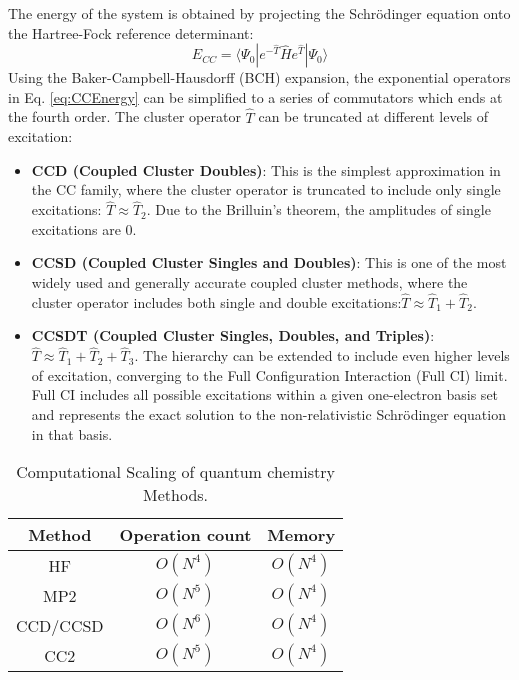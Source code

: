 \iffalse One of the most significant advantages of coupled cluster theory is its property of size consistency. A size-consistent method correctly describes the energy of a system composed of multiple non-interacting subsystems as the sum of the energies of the individual subsystems. The exponential form, when expanded as a Taylor series,
\begin{equation}
    e^{\hat{T}} = 1 + \hat{T} + \frac{1}{2!} \hat{T}^2 + \dots
\end{equation}
inherently includes terms that represent disconnected clusters, which are essential for size consistency. \fi
The energy of the system is obtained by projecting the Schrödinger equation onto the Hartree-Fock reference determinant:
\begin{equation}\label{eq:CCEnergy}
    E_{CC}=\langle \Psi_{0} | e^{-\hat{T}} \hat{H} e^{\hat{T}} | \Psi_{0} \rangle
\end{equation}
Using the Baker-Campbell-Hausdorff (BCH) expansion, the exponential operators in Eq. \ref{eq:CCEnergy} can be simplified to a series of commutators which ends at the fourth order. The cluster operator $\hat{T}$ can be truncated at different levels of excitation:
\begin{itemize}
    \item \textbf{CCD (Coupled Cluster Doubles)}: This is the simplest approximation in the CC family, where the cluster operator is truncated to include only single excitations: $\hat{T} \approx \hat{T}_2$. Due to the Brilluin's theorem, the amplitudes of single excitations are 0. 
    \item \textbf{CCSD (Coupled Cluster Singles and Doubles)}: This is one of the most widely used and generally accurate coupled cluster methods, where the cluster operator includes both single and double excitations:$\hat{T} \approx \hat{T}_1 + \hat{T}_2$.
    \item \textbf{CCSDT (Coupled Cluster Singles, Doubles, and Triples)}: $\hat{T} \approx \hat{T}_1 + \hat{T}_2 + \hat{T}_3$.
    The hierarchy can be extended to include even higher levels of excitation, converging to the Full Configuration Interaction (Full CI) limit. Full CI includes all possible excitations within a given one-electron basis set and represents the exact solution to the non-relativistic Schrödinger equation in that basis.
\end{itemize}

\begin{table}[h!]
    \centering
    \begin{tabular}{ccc}
        Method & Operation count & Memory \\
        \hline
        HF & $O(N^4)$ & $O(N^4)$ \\
        MP2 & $O(N^5)$ & $O(N^4)$ \\
        CCD/CCSD & $O(N^6)$ & $O(N^4)$ \\
        CC2 & $O(N^{5})$ & $O(N^4)$ \\
    \end{tabular}
    \caption{Computational Scaling of quantum chemistry Methods.}
    \label{tab:qc_scaling}
\end{table}



